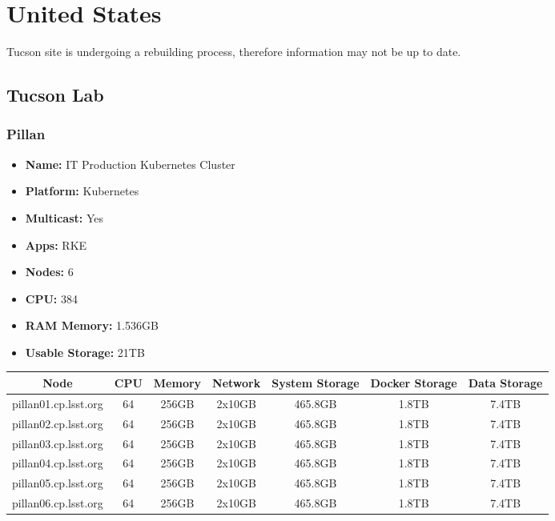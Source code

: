 \newpage
\section{United States}
\vspace*{-\baselineskip}
Tucson site is undergoing a rebuilding process, therefore information may not be up to date.
\subsection{Tucson Lab}
\subsubsection{Pillan}
\begin{itemize}
  \itemsep0em 
  \item \textbf{Name:}       IT Production Kubernetes Cluster
  \item \textbf{Platform:}   Kubernetes
  \item \textbf{Multicast:}  Yes
  \item \textbf{Apps:}       RKE
  \item \textbf{Nodes:}      6
  \item \textbf{CPU:}        384
  \item \textbf{RAM Memory:} 1.536GB
  \item \textbf{Usable Storage:} 21TB
\end{itemize}
\begin{center}
  \small
  \begin{tabular}{||c c c c c c c||} 
    \hline
    \textbf{Node} & \textbf{CPU} & \textbf{Memory} & \textbf{Network} & \textbf{System Storage} & \textbf{Docker Storage} & \textbf{Data Storage} \\ [0.5ex]
    \hline
    pillan01.cp.lsst.org & 64 & 256GB & 2x10GB & 465.8GB & 1.8TB & 7.4TB \\
    \hline
    pillan02.cp.lsst.org & 64 & 256GB & 2x10GB & 465.8GB & 1.8TB & 7.4TB \\
    \hline
    pillan03.cp.lsst.org & 64 & 256GB & 2x10GB & 465.8GB & 1.8TB & 7.4TB \\
    \hline
    pillan04.cp.lsst.org & 64 & 256GB & 2x10GB & 465.8GB & 1.8TB & 7.4TB \\
    \hline
    pillan05.cp.lsst.org & 64 & 256GB & 2x10GB & 465.8GB & 1.8TB & 7.4TB \\
    \hline
    pillan06.cp.lsst.org & 64 & 256GB & 2x10GB & 465.8GB & 1.8TB & 7.4TB \\
    \hline
  \end{tabular}
\end{center}

